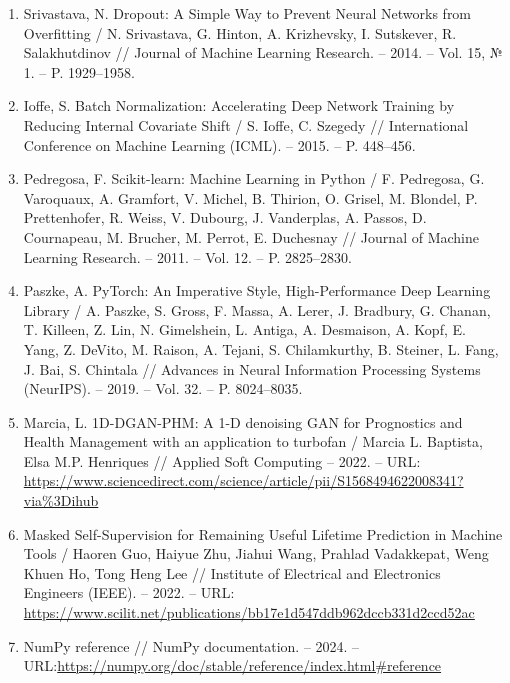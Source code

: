 \documentclass[14pt, a4paper, oneside]{extreport}
\begin{document}
\begin{enumerate}
\item Srivastava, N. Dropout: A Simple Way to Prevent Neural Networks from Overfitting / N. Srivastava, G. Hinton, A. Krizhevsky, I. Sutskever, R. Salakhutdinov // Journal of Machine Learning Research. – 2014. – Vol. 15, № 1. – P. 1929–1958.

\item Ioffe, S. Batch Normalization: Accelerating Deep Network Training by Reducing Internal Covariate Shift / S. Ioffe, C. Szegedy // International Conference on Machine Learning (ICML). – 2015. – P. 448–456.

\item Pedregosa, F. Scikit-learn: Machine Learning in Python / F. Pedregosa, G. Varoquaux, A. Gramfort, V. Michel, B. Thirion, O. Grisel, M. Blondel, P. Prettenhofer, R. Weiss, V. Dubourg, J. Vanderplas, A. Passos, D. Cournapeau, M. Brucher, M. Perrot, E. Duchesnay // Journal of Machine Learning Research. – 2011. – Vol. 12. – P. 2825–2830.

\item Paszke, A. PyTorch: An Imperative Style, High-Performance Deep Learning Library / A. Paszke, S. Gross, F. Massa, A. Lerer, J. Bradbury, G. Chanan, T. Killeen, Z. Lin, N. Gimelshein, L. Antiga, A. Desmaison, A. Kopf, E. Yang, Z. DeVito, M. Raison, A. Tejani, S. Chilamkurthy, B. Steiner, L. Fang, J. Bai, S. Chintala // Advances in Neural Information Processing Systems (NeurIPS). – 2019. – Vol. 32. – P. 8024–8035.

\item Marcia, L. 1D-DGAN-PHM: A 1-D denoising GAN for Prognostics and Health Management with an application to turbofan / Marcia L. Baptista, Elsa M.P. Henriques // Applied Soft Computing – 2022. – URL: \url{https://www.sciencedirect.com/science/article/pii/S1568494622008341?via%3Dihub}

\item Masked Self-Supervision for Remaining Useful Lifetime Prediction in Machine Tools / Haoren Guo, Haiyue Zhu, Jiahui Wang, Prahlad Vadakkepat, Weng Khuen Ho, Tong Heng Lee // Institute of Electrical and Electronics Engineers (IEEE). – 2022. – URL: \url{https://www.scilit.net/publications/bb17e1d547ddb962dccb331d2ccd52ac}

\item NumPy reference // NumPy documentation. – 2024. – URL:\url{https://numpy.org/doc/stable/reference/index.html#reference} 


\end{enumerate}
\end{document}
